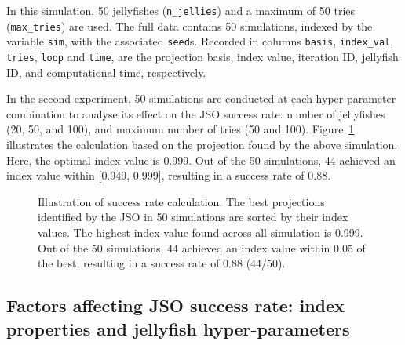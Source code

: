 \documentclass[
  number,
  preprint,
  3p]{elsarticle}
\begin{document}
In this simulation, 50 jellyfishes (\texttt{n\_jellies}) and a maximum
of 50 tries (\texttt{max\_tries}) are used. The full data contains 50
simulations, indexed by the variable \texttt{sim}, with the associated
\texttt{seed}s. Recorded in columns \texttt{basis}, \texttt{index\_val},
\texttt{tries}, \texttt{loop} and \texttt{time}, are the projection
basis, index value, iteration ID, jellyfish ID, and computational time,
respectively.

In the second experiment, 50 simulations are conducted at each
hyper-parameter combination to analyse its effect on the JSO success
rate: number of jellyfishes (20, 50, and 100), and maximum number of
tries (50 and 100). Figure~\ref{fig-success-rate} illustrates the
calculation based on the projection found by the above simulation. Here,
the optimal index value is 0.999. Out of the 50 simulations, 44 achieved
an index value within {[}0.949, 0.999{]}, resulting in a success rate of
0.88.

\begin{figure}


\caption{\label{fig-success-rate}Illustration of success rate
calculation: The best projections identified by the JSO in 50
simulations are sorted by their index values. The highest index value
found across all simulation is 0.999. Out of the 50 simulations, 44
achieved an index value within 0.05 of the best, resulting in a success
rate of 0.88 (44/50).}

\end{figure}%

\subsection{Factors affecting JSO success rate: index properties and
jellyfish hyper-parameters}\label{sec-app-2}
\end{document}
